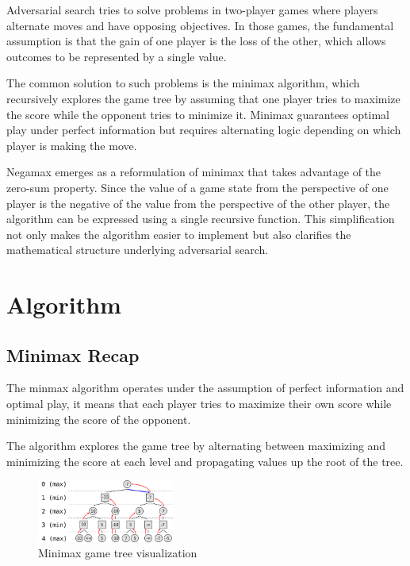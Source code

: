 \documentclass{LSkill}  %
\begin{document}
Adversarial search tries to solve problems in two-player games where players alternate moves and have opposing objectives.
In those games, the fundamental assumption is that the gain of one player is the loss of the other, which allows outcomes to be represented by a single value.

The common solution to such problems is the minimax algorithm, which recursively explores the game tree by assuming that one player tries to maximize the score while the opponent tries to minimize it. Minimax guarantees optimal play under perfect information but requires alternating logic depending on which player is making the move\cite{russell2009artificial}.

Negamax emerges as a reformulation of minimax that takes advantage of the zero-sum property. Since the value of a game state from the perspective of one player is the negative of the value from the perspective of the other player, the algorithm can be expressed using a single recursive function. 
This simplification not only makes the algorithm easier to implement but also clarifies the mathematical structure underlying adversarial search.

\section{Algorithm}

\subsection{Minimax Recap}
The minmax algorithm operates under the assumption of perfect information and optimal play, it means that each player tries to maximize their own score while minimizing the score of the opponent.

The algorithm explores the game tree by alternating between maximizing and minimizing the score at each level and propagating values up the root of the tree. 

\begin{figure}[h]
    \centering
    \includegraphics[width=0.4\textwidth]{images/minimax_tree.png}
    \caption{Minimax game tree visualization}
    \label{fig:minimax_tree}
\end{figure}
\end{document}
